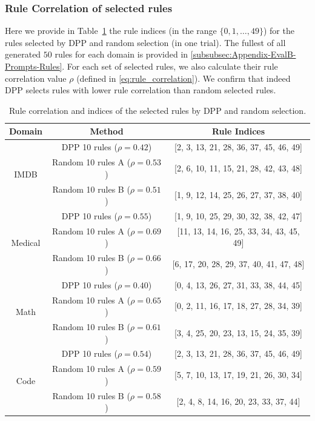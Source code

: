 \documentclass{article}
\newcommand{\mytiny}{\fontsize{8pt}{10pt}\selectfont}
\begin{document}
\subsubsection{Rule Correlation of selected rules}\label{subsubsec:Appendix-EvalB-RuleCorr}
Here we provide in Table~\ref{tab:Appendix-EvalB-RuleIndices} the rule indices (in the range $\{0,1,\dots, 49\}$) for the rules selected by DPP and random selection (in one trial). The fullest of all generated $50$ rules for each domain is provided in \ref{subsubsec:Appendix-EvalB-Prompts-Rules}. For each set of selected rules, we also calculate their rule correlation value $\rho$ (defined in \ref{eq:rule_correlation}). We confirm that indeed DPP selects rules with lower rule correlation than random selected rules.

\begin{table}[htbp]
\centering
\mytiny
\caption{Rule correlation and indices of the selected rules by DPP and random selection.}
\label{tab:Appendix-EvalB-RuleIndices}
\begin{tabular}{c|c|c} 
\hline
\textbf{Domain} & \textbf{Method} & \textbf{Rule Indices} \\ 
\hline
\multirow{3}{*}{IMDB} & DPP 10 rules ($\rho=0.42$) & [2, 3, 13, 21, 28, 36, 37, 45, 46, 49] \\
 & Random 10 rules A ($\rho=0.53$) & [2, 6, 10, 11, 15, 21, 28, 42, 43, 48] \\
 & Random 10 rules B ($\rho=0.51$) & [1, 9, 12, 14, 25, 26, 27, 37, 38, 40] \\
\hline
\multirow{3}{*}{Medical} & DPP 10 rules ($\rho=0.55$) & [1, 9, 10, 25, 29, 30, 32, 38, 42, 47] \\
 & Random 10 rules A ($\rho=0.69$) & [11, 13, 14, 16, 25, 33, 34, 43, 45, 49] \\
 & Random 10 rules B ($\rho=0.66$) & [6, 17, 20, 28, 29, 37, 40, 41, 47, 48] \\
\hline
\multirow{3}{*}{Math} & DPP 10 rules ($\rho=0.40$) & [0, 4, 13, 26, 27, 31, 33, 38, 44, 45] \\
 & Random 10 rules A ($\rho=0.65$) & [0, 2, 11, 16, 17, 18, 27, 28, 34, 39] \\
 & Random 10 rules B ($\rho=0.61$) & [3, 4, 25, 20, 23, 13, 15, 24, 35, 39] \\
\hline
\multirow{3}{*}{Code} & DPP 10 rules ($\rho=0.54$) & [2, 3, 13, 21, 28, 36, 37, 45, 46, 49] \\
 & Random 10 rules A ($\rho=0.59$) & [5, 7, 10, 13, 17, 19, 21, 26, 30, 34] \\
 & Random 10 rules B ($\rho=0.58$) & [2, 4, 8, 14, 16, 20, 23, 33, 37, 44] \\
\hline
\end{tabular}
\end{table}
\end{document}
